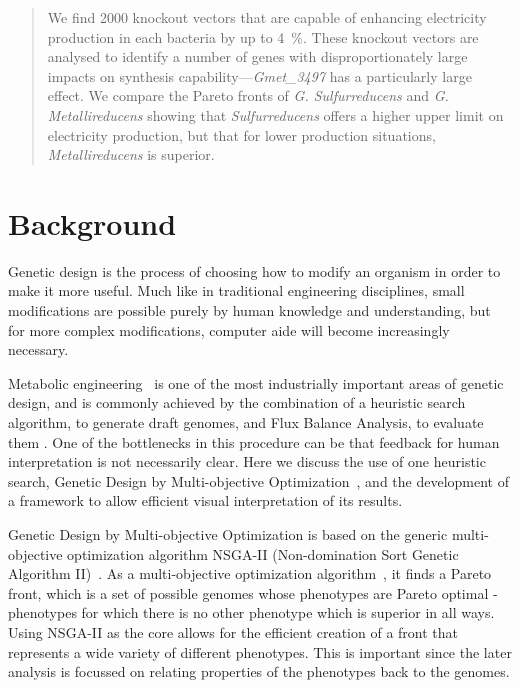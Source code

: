 \documentclass[a4paper]{article}
\begin{document}
\begin{abstract}
\begin{description}
We find 2000 knockout vectors that are capable of enhancing electricity production in each bacteria by up to \SI{4}{\percent}. These knockout vectors are analysed to identify a number of genes with disproportionately large impacts on synthesis capability---{\it Gmet\_3497} has a particularly large effect. We compare the Pareto fronts of {\it G. Sulfurreducens} and {\it G. Metallireducens} showing that {\it Sulfurreducens} offers a higher upper limit on electricity production, but that for lower production situations, {\it Metallireducens} is superior.

\end{description}
\end{abstract}

\section{Background}

Genetic design is the process of choosing how to modify an organism in order to make it more useful. Much like in traditional engineering disciplines, small modifications are possible purely by human knowledge and understanding, but for more complex modifications, computer aide will become increasingly necessary.

Metabolic engineering~\cite{stephanopoulos1999metabolic} is one of the most industrially important areas of genetic design, and is commonly achieved by the combination of a heuristic search algorithm, to generate draft genomes, and Flux Balance Analysis, to evaluate them \cite{Orth2010}. One of the bottlenecks in this procedure can be that feedback for human interpretation is not necessarily clear. Here we discuss the use of one heuristic search, Genetic Design by Multi-objective Optimization~\cite{Costanza2012}, and the development of a framework to allow efficient visual interpretation of its results.

Genetic Design by Multi-objective Optimization is based on the generic multi-objective optimization algorithm NSGA-II (Non-domination Sort Genetic Algorithm II)~\cite{Deb2002a}. As a multi-objective optimization  algorithm~\cite{Gen2008}, it finds a Pareto front, which is a set of possible genomes whose phenotypes are Pareto optimal - phenotypes for which there is no other phenotype which is superior in all ways. Using NSGA-II as the core allows for the efficient creation of a front that represents a wide variety of different phenotypes. This is important since the later analysis is focussed on relating properties of the phenotypes back to the genomes.
\end{document}
